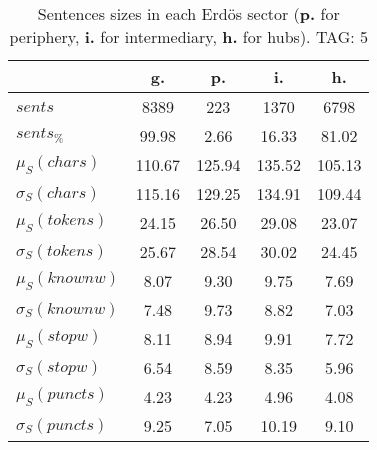 \begin{table}[h!]
\begin{center}
\begin{tabular}{| l || c | c | c | c |}\hline
 & {\bf g.} & {\bf p.} & {\bf i.} & {\bf h.} \\\hline\hline
$sents$ & 8389  & 223  & 1370  & 6798 \\
$sents_{\%}$ & 99.98  & 2.66  & 16.33  & 81.02 \\\hline
$\mu_S(chars)$ & 110.67  & 125.94  & 135.52  & 105.13 \\
$\sigma_S(chars)$ & 115.16  & 129.25  & 134.91  & 109.44 \\\hline
$\mu_S(tokens)$ & 24.15  & 26.50  & 29.08  & 23.07 \\
$\sigma_S(tokens)$ & 25.67  & 28.54  & 30.02  & 24.45 \\\hline
$\mu_S(knownw)$ & 8.07  & 9.30  & 9.75  & 7.69 \\
$\sigma_S(knownw)$ & 7.48  & 9.73  & 8.82  & 7.03 \\\hline
$\mu_S(stopw)$ & 8.11  & 8.94  & 9.91  & 7.72 \\
$\sigma_S(stopw)$ & 6.54  & 8.59  & 8.35  & 5.96 \\\hline
$\mu_S(puncts)$ & 4.23  & 4.23  & 4.96  & 4.08 \\
$\sigma_S(puncts)$ & 9.25  & 7.05  & 10.19  & 9.10 \\\hline
\end{tabular}
\caption{Sentences sizes in each Erd\"os sector ({{\bf p.}} for periphery, {{\bf i.}} for intermediary, {{\bf h.}} for hubs). TAG: 5}
\end{center}
\end{table}